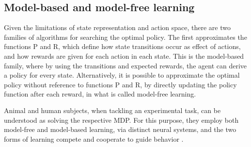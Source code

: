     \subsection{Model-based and model-free learning}
        Given the limitations of state representation and action space, there are two families of algorithms for searching the optimal policy. The first approximates the functions P and R, which define how state transitions occur as effect of actions, and how rewards are given for each action in each state. This is the model-based family, where by using the transitions and expected rewards, the agent can derive a policy for every state. Alternatively, it is possible to approximate the optimal policy without reference to functions P and R, by directly updating the policy function after each reward, in what is called model-free learning.
        
        Animal and human subjects, when tackling an experimental task, can be understood as solving the respective MDP. For this purpose, they employ both model-free and model-based learning, via distinct neural systems, and the two forms of learning compete and cooperate to guide behavior \cite{kool2018competition}. 
